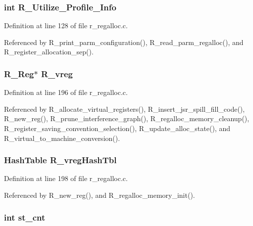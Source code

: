 \subsubsection{\setlength{\rightskip}{0pt plus 5cm}int \bf{R\_\-Utilize\_\-Profile\_\-Info}}\label{r__regalloc_8h_cb42be9fdd1b603eb7b714df20afc9ae}




Definition at line 128 of file r\_\-regalloc.c.

Referenced by R\_\-print\_\-parm\_\-configuration(), R\_\-read\_\-parm\_\-regalloc(), and R\_\-register\_\-allocation\_\-sep().
\subsubsection{\setlength{\rightskip}{0pt plus 5cm}\bf{R\_\-Reg}$\ast$ \bf{R\_\-vreg}}\label{r__regalloc_8h_2dbcf950358669643eac003e20df4a6f}




Definition at line 196 of file r\_\-regalloc.c.

Referenced by R\_\-allocate\_\-virtual\_\-registers(), R\_\-insert\_\-jsr\_\-spill\_\-fill\_\-code(), R\_\-new\_\-reg(), R\_\-prune\_\-interference\_\-graph(), R\_\-regalloc\_\-memory\_\-cleanup(), R\_\-register\_\-saving\_\-convention\_\-selection(), R\_\-update\_\-alloc\_\-state(), and R\_\-virtual\_\-to\_\-machine\_\-conversion().
\subsubsection{\setlength{\rightskip}{0pt plus 5cm}\bf{Hash\-Table} \bf{R\_\-vreg\-Hash\-Tbl}}\label{r__regalloc_8h_5af1440b54ff2374201da593736f163c}




Definition at line 198 of file r\_\-regalloc.c.

Referenced by R\_\-new\_\-reg(), and R\_\-regalloc\_\-memory\_\-init().
\subsubsection{\setlength{\rightskip}{0pt plus 5cm}int \bf{st\_\-cnt}}\label{r__regalloc_8h_2e851ea165e823befccbe6bee6d064f2}




